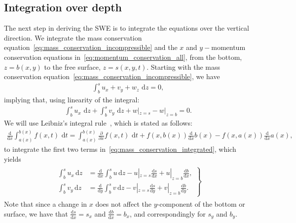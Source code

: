 \subsection{Integration over depth}
The next step in deriving the SWE is to integrate the equations over the vertical direction.
We integrate the mass conservation equation~\eqref{eq:mass_conservation_incompressible} and the $x$ and $y-$momentum conservation equations in~\eqref{eq:momentum_conservation_all}, from the bottom, $z = b(x,y)$ to the free surface, $z = s(x,y,t)$.
Starting with the mass conservation equation~\eqref{eq:mass_conservation_incompressible}, we have
\begin{align*}
    \int_{b}^{s} u_x + v_y + w_z \text{ d} z = 0,
\end{align*}
implying that, using linearity of the integral:
\begin{align}\label{eq:mass_conservation_integrated}
    \int_{b}^{s} u_x \text{ d} z + \int_{b}^{s} v_y \text{ d} z  + w|_{z = s} - w|_{z = b} = 0.
\end{align}
We will use Leibniz's integral rule~\cite{Leibniz}, which is stated as follows:
\begin{align}\label{eq:leibniz_rule}
    \frac{\text{d}}{\text{d} x} \int_{a(x)}^{b(x)} f(x,t) \text{ d} t
    = \int_{a(x)}^{b(x)} \frac{\partial }{\partial x} f(x, t) \text{ d} t + f(x, b(x)) \frac{\text{d}}{\text{d} x} b(x) - f(x, a(x)) \frac{\text{d}}{\text{d} x} a(x),
\end{align}
to integrate the first two terms in~\eqref{eq:mass_conservation_integrated}, which yields
\begin{align}\label{eq:leibniz_rule_applied}
    \begin{gathered}
        \left.
        \begin{aligned}
        \int_{b}^{s} u_x \, \text{d} z &=  \frac{\text{d}}{\text{d} x}  \int_{b}^{s} u \, \text{d} z  - u|_{z = s} \frac{\text{d} s}{\text{d} x} + u|_{z = b} \frac{\text{d} b}{\text{d} x}, \\
        \int_{b}^{s} v_y \, \text{d} z &=  \frac{\text{d}}{\text{d} y}  \int_{b}^{s} v \, \text{d} z  - v|_{z = s} \frac{\text{d} s}{\text{d} y} + v|_{z = b} \frac{\text{d} b}{\text{d} y}.
        \end{aligned}
        \right\}
    \end{gathered}
\end{align}
Note that since a change in $x$ does not affect the $y$-component of the bottom or surface, we have that $\frac{\text{d} s}{\text{d} x} = s_x$ and $ \frac{\text{d} b}{\text{d} x} = b_x$, and correspondingly for $s_y$ and $b_y$.
